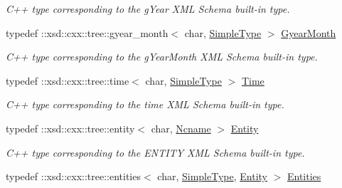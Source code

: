 \begin{DoxyCompactItemize}
\begin{DoxyCompactList}\small\item\em C++ type corresponding to the gYear XML Schema built-\/in type. \item\end{DoxyCompactList}\item 
\hypertarget{namespacexml__schema_a1d88a18a52a8b9f3b1c8d2c865ba089d}{
typedef ::xsd::cxx::tree::gyear\_\-month$<$ char, \hyperlink{namespacexml__schema_a1171be9b6e593e49b895a46671f5dc5f}{SimpleType} $>$ \hyperlink{namespacexml__schema_a1d88a18a52a8b9f3b1c8d2c865ba089d}{GyearMonth}}
\label{namespacexml__schema_a1d88a18a52a8b9f3b1c8d2c865ba089d}

\begin{DoxyCompactList}\small\item\em C++ type corresponding to the gYearMonth XML Schema built-\/in type. \item\end{DoxyCompactList}\item 
\hypertarget{namespacexml__schema_a9089f1cb5793341884da2b1faa310f09}{
typedef ::xsd::cxx::tree::time$<$ char, \hyperlink{namespacexml__schema_a1171be9b6e593e49b895a46671f5dc5f}{SimpleType} $>$ \hyperlink{namespacexml__schema_a9089f1cb5793341884da2b1faa310f09}{Time}}
\label{namespacexml__schema_a9089f1cb5793341884da2b1faa310f09}

\begin{DoxyCompactList}\small\item\em C++ type corresponding to the time XML Schema built-\/in type. \item\end{DoxyCompactList}\item 
\hypertarget{namespacexml__schema_a34af04faeed4d3cfc482a9f4fa43aa4b}{
typedef ::xsd::cxx::tree::entity$<$ char, \hyperlink{namespacexml__schema_aceb9a08fa292b3b3af49f5aa42d06fa9}{Ncname} $>$ \hyperlink{namespacexml__schema_a34af04faeed4d3cfc482a9f4fa43aa4b}{Entity}}
\label{namespacexml__schema_a34af04faeed4d3cfc482a9f4fa43aa4b}

\begin{DoxyCompactList}\small\item\em C++ type corresponding to the ENTITY XML Schema built-\/in type. \item\end{DoxyCompactList}\item 
\hypertarget{namespacexml__schema_a906654593daefd1bd7462fa2434a6002}{
typedef ::xsd::cxx::tree::entities$<$ char, \hyperlink{namespacexml__schema_a1171be9b6e593e49b895a46671f5dc5f}{SimpleType}, \hyperlink{namespacexml__schema_a34af04faeed4d3cfc482a9f4fa43aa4b}{Entity} $>$ \hyperlink{namespacexml__schema_a906654593daefd1bd7462fa2434a6002}{Entities}}
\label{namespacexml__schema_a906654593daefd1bd7462fa2434a6002}


\end{DoxyCompactItemize}

